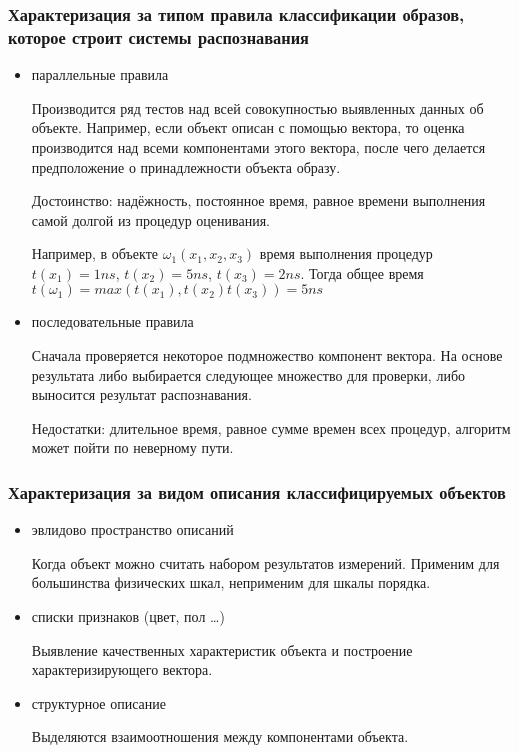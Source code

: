 		    \subsubsection{Характеризация за типом правила классификации образов, которое строит системы распознавания}
		        \begin{itemize}
			        \item параллельные правила
			        
				        Производится ряд тестов над всей совокупностью выявленных данных об объекте. Например, если объект описан с помощью вектора, то оценка производится над всеми компонентами этого вектора, после чего делается предположение о принадлежности объекта образу. 
				        
				        Достоинство: надёжность, постоянное время, равное времени выполнения самой долгой из процедур оценивания. 
				        
				        Например, в объекте $\omega_1(x_1, x_2, x_3)$ время выполнения процедур $t(x_1) = 1 ns$, $t(x_2) = 5 ns$, $t(x_3) = 2 ns$. Тогда общее время $t(\omega_1) = max(t(x_1), t(x_2) t(x_3)) = 5 ns$ 
				    \item последовательные правила
				    
				        Сначала проверяется некоторое подмножество компонент вектора. На основе результата либо выбирается следующее множество для проверки, либо выносится результат распознавания.
				        
				        Недостатки: длительное время, равное сумме времен всех процедур, алгоритм может пойти по неверному пути.
			    \end{itemize}
		    \subsubsection{Характеризация за видом описания классифицируемых объектов} 
		        \begin{itemize}
			        \item эвлидово пространство описаний
			        
			            Когда объект можно считать набором результатов измерений. Применим для большинства физических шкал, неприменим для шкалы порядка.
				    \item списки признаков (цвет, пол \dots)
				    
				        Выявление качественных характеристик объекта и построение характеризирующего вектора.
				    \item структурное описание 
				        
				        Выделяются взаимоотношения между компонентами объекта.
			    \end{itemize}
		    
	    

